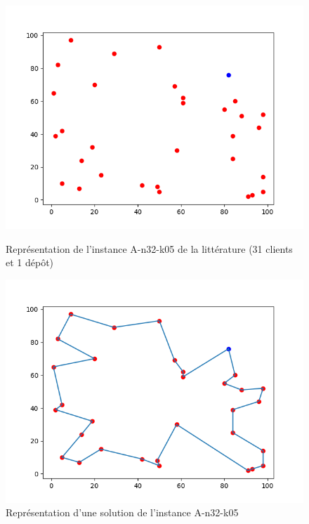 \documentclass[a4paper,11pt]{article}%
\begin{document}
\begin{figure}
    \begin{minipage}[c]{.46\linewidth}
        \centering
		\includegraphics[scale=0.5]{Instance.png}
		\caption{Représentation de l'instance A-n32-k05 de la littérature (31 clients et 1 dépôt)}
		\label{Instance3205}
    \end{minipage}
    \hfill%
    \begin{minipage}[c]{.46\linewidth}
        \centering
        \includegraphics[scale=0.5]{solutionNoCapacity.png}
		\caption{Représentation d'une solution de l'instance A-n32-k05}
		\label{SNC3205}
    \end{minipage}
\end{figure}
\end{document}
